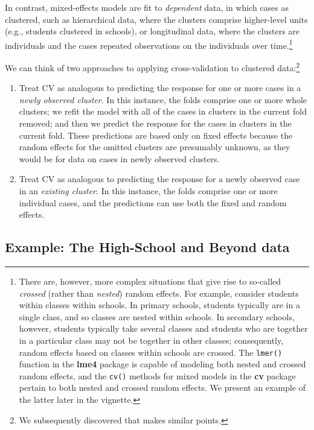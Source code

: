 \documentclass[
]{jss}
\begin{document}
In contrast, mixed-effects models are fit to \emph{dependent} data, in
which cases as clustered, such as hierarchical data, where the clusters
comprise higher-level units (e.g., students clustered in schools), or
longitudinal data, where the clusters are individuals and the cases
repeated observations on the individuals over time.\footnote{There are,
  however, more complex situations that give rise to so-called
  \emph{crossed} (rather than \emph{nested}) random effects. For
  example, consider students within classes within schools. In primary
  schools, students typically are in a single class, and so classes are
  nested within schools. In secondary schools, however, students
  typically take several classes and students who are together in a
  particular class may not be together in other classes; consequently,
  random effects based on classes within schools are crossed. The
  \texttt{lmer()} function in the \textbf{lme4} package is capable of
  modeling both nested and crossed random effects, and the \texttt{cv()}
  methods for mixed models in the \textbf{cv} package pertain to both
  nested and crossed random effects. We present an example of the latter
  later in the vignette.}

We can think of two approaches to applying cross-validation to clustered
data:\footnote{We subsequently discovered that \citet[Section
  8]{Vehtari:2023} makes similar points.}

\begin{enumerate}
\def\labelenumi{\arabic{enumi}.}
\item
  Treat CV as analogous to predicting the response for one or more cases
  in a \emph{newly observed cluster}. In this instance, the folds
  comprise one or more whole clusters; we refit the model with all of
  the cases in clusters in the current fold removed; and then we predict
  the response for the cases in clusters in the current fold. These
  predictions are based only on fixed effects because the random effects
  for the omitted clusters are presumably unknown, as they would be for
  data on cases in newly observed clusters.
\item
  Treat CV as analogous to predicting the response for a newly observed
  case in an \emph{existing cluster}. In this instance, the folds
  comprise one or more individual cases, and the predictions can use
  both the fixed and random effects.
\end{enumerate}

\hypertarget{example-the-high-school-and-beyond-data}{%
\subsection{Example: The High-School and Beyond
data}\label{example-the-high-school-and-beyond-data}}
\end{document}
